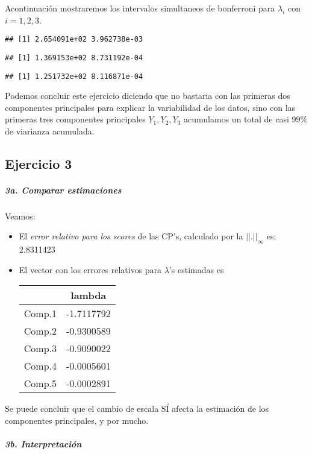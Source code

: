 \documentclass[]{article}
\let\oldsubparagraph\subparagraph
\renewcommand{\subparagraph}[1]{\oldsubparagraph{#1}\mbox{}}
\begin{document}
Acontinuación mostraremos los intervalos simultaneos de bonferroni para
\(\lambda_i\) con \(i = 1,2,3\).

\begin{verbatim}
## [1] 2.654091e+02 3.962738e-03
\end{verbatim}

\begin{verbatim}
## [1] 1.369153e+02 8.731192e-04
\end{verbatim}

\begin{verbatim}
## [1] 1.251732e+02 8.116871e-04
\end{verbatim}

Podemos concluir este ejercicio diciendo que no bastaria con las
primeras dos componentes principales para explicar la variabilidad de
los datos, sino con las primeras tres componentes principales
\(Y_{1},Y_{2},Y_{3}\) acumulamos un total de casi \(99\%\) de viarianza
acumulada.

\hypertarget{ejercicio-3}{%
\subsection{Ejercicio 3}\label{ejercicio-3}}

\hypertarget{a.-comparar-estimaciones}{%
\subparagraph{3a. Comparar
estimaciones}\label{a.-comparar-estimaciones}}

Veamos:

\begin{itemize}
\item
  El \emph{error relativo para los scores} de las CP's, calculado por la
  \(|| . ||_{\infty}\) es: 2.8311423
\item
  El vector con los errores relativos para \(\lambda\)'s estimadas es

  \begin{longtable}[]{@{}lc@{}}
  \toprule
  & lambda\tabularnewline
  \midrule
  \endhead
  Comp.1 & -1.7117792\tabularnewline
  Comp.2 & -0.9300589\tabularnewline
  Comp.3 & -0.9090022\tabularnewline
  Comp.4 & -0.0005601\tabularnewline
  Comp.5 & -0.0002891\tabularnewline
  \bottomrule
  \end{longtable}
\end{itemize}

Se puede concluir que el cambio de escala SÍ afecta la estimación de los
componentes principales, y por mucho.

\hypertarget{b.-interpretacion}{%
\subparagraph{3b. Interpretación}\label{b.-interpretacion}}
\end{document}
